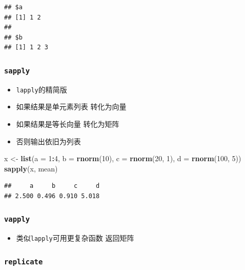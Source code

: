 \documentclass[
]{book}
\newenvironment{Shaded}{\begin{snugshade}}{\end{snugshade}}
\newcommand{\DataTypeTok}[1]{\textcolor[rgb]{0.13,0.29,0.53}{#1}}
\newcommand{\DecValTok}[1]{\textcolor[rgb]{0.00,0.00,0.81}{#1}}
\newcommand{\KeywordTok}[1]{\textcolor[rgb]{0.13,0.29,0.53}{\textbf{#1}}}
\newcommand{\NormalTok}[1]{#1}
\newcommand{\OperatorTok}[1]{\textcolor[rgb]{0.81,0.36,0.00}{\textbf{#1}}}
\newcommand{\StringTok}[1]{\textcolor[rgb]{0.31,0.60,0.02}{#1}}
\providecommand{\tightlist}{%
  \setlength{\itemsep}{0pt}\setlength{\parskip}{0pt}}
\begin{document}
\begin{verbatim}
## $a
## [1] 1 2
## 
## $b
## [1] 1 2 3
\end{verbatim}

\hypertarget{sapply}{%
\subsubsection{\texorpdfstring{\texttt{sapply}}{sapply}}\label{sapply}}

\begin{itemize}
\tightlist
\item
  \texttt{lapply}的精简版
\item
  如果结果是单元素列表 转化为向量
\item
  如果结果是等长向量 转化为矩阵
\item
  否则输出依旧为列表
\end{itemize}

\begin{Shaded}
\begin{Highlighting}[]
\NormalTok{x <-}\StringTok{ }\KeywordTok{list}\NormalTok{(}\DataTypeTok{a =} \DecValTok{1}\OperatorTok{:}\DecValTok{4}\NormalTok{, }\DataTypeTok{b =} \KeywordTok{rnorm}\NormalTok{(}\DecValTok{10}\NormalTok{), }\DataTypeTok{c =} \KeywordTok{rnorm}\NormalTok{(}\DecValTok{20}\NormalTok{, }\DecValTok{1}\NormalTok{), }\DataTypeTok{d =} \KeywordTok{rnorm}\NormalTok{(}\DecValTok{100}\NormalTok{, }\DecValTok{5}\NormalTok{))}
\KeywordTok{sapply}\NormalTok{(x, mean)}
\end{Highlighting}
\end{Shaded}

\begin{verbatim}
##     a     b     c     d 
## 2.500 0.496 0.910 5.018
\end{verbatim}

\hypertarget{vapply}{%
\subsubsection{\texorpdfstring{\texttt{vapply}}{vapply}}\label{vapply}}

\begin{itemize}
\tightlist
\item
  类似\texttt{lapply}可用更复杂函数 返回矩阵
\end{itemize}

\hypertarget{replicate}{%
\subsubsection{\texorpdfstring{\texttt{replicate}}{replicate}}\label{replicate}}
\end{document}
